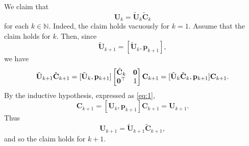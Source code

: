 \documentclass[11pt,a4paper]{article}
\newcommand{\0}{\M{0}}
\newcommand{\M}[1]{\mathbf{#1}}
\newcommand{\Mt}[1]{\tilde{\M{#1}}}
\newcommand{\N}{\mathbb{N}}
\newcommand{\T}{\top}
\newcommand{\ve}[1]{\mathbf{#1}}
\begin{document}
We claim that
\begin{equation}
  \label{eq:1}
  \M{U}_k = \Mt{U}_k \Mt{C}_k
\end{equation}
for each $k \in \N$.  Indeed, the claim holds vacuously for $k = 1$. Assume that the claim holds for $k$. Then, since
\begin{displaymath}
  \Mt{U}_{k+1} = [\Mt{U}_k, \ve{p}_{k+1}],
\end{displaymath}
we have
\begin{displaymath}
  \Mt{U}_{k+1} \Mt{C}_{k+1}
  =
  [\Mt{U}_k, \ve{p}_{k+1}]
  \begin{bmatrix}
    \Mt{C}_k & \0
    \\
    \0^\T & 1
  \end{bmatrix}
  \M{C}_{k+1}
  \\
  =
  [\Mt{U}_k  \Mt{C}_k, \ve{p}_{k+1}] \M{C}_{k+1}.
\end{displaymath}
By the inductive hypothesis, expressed as \eqref{eq:1}, 
\begin{displaymath}
  [\Mt{U}_k  \Mt{C}_k, \ve{p}_{k+1}] \M{C}_{k+1}
  =
  [\M{U}_k, \ve{p}_{k+1}] \M{C}_{k+1}
  =
  \M{U}_{k+1}.
\end{displaymath}
Thus
\begin{displaymath}
  \label{eq:1}
  \M{U}_{k+1} = \Mt{U}_{k+1} \Mt{C}_{k+1},
\end{displaymath}
and so the claim holds for $k+1$.



\end{document}
